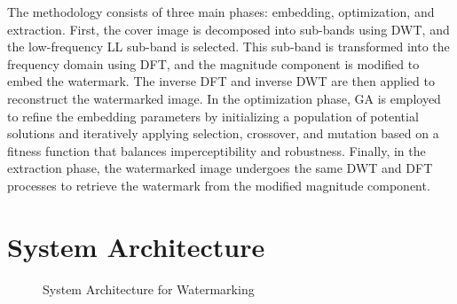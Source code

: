 The methodology consists of three main phases: embedding, optimization, and extraction. First, the cover image is decomposed into sub-bands using DWT, and the low-frequency LL sub-band is selected. This sub-band is transformed into the frequency domain using DFT, and the magnitude component is modified to embed the watermark. The inverse DFT and inverse DWT are then applied to reconstruct the watermarked image. In the optimization phase, GA is employed to refine the embedding parameters by initializing a population of potential solutions and iteratively applying selection, crossover, and mutation based on a fitness function that balances imperceptibility and robustness. Finally, in the extraction phase, the watermarked image undergoes the same DWT and DFT processes to retrieve the watermark from the modified magnitude component.

\section{System Architecture}

\begin{figure}[H]
\centering
{}
\caption{System Architecture for Watermarking}
\label{fig:architecture}
\end{figure}


